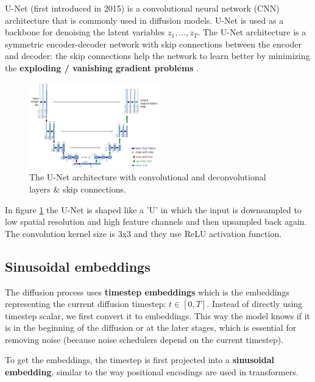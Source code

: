U-Net (first introduced in 2015) \cite{unet} is a convolutional neural network (CNN) architecture that is commonly used in diffusion models. U-Net is used as a backbone for denoising the latent variables $z_1, ..., z_T$. The U-Net architecture is a symmetric encoder-decoder network with skip connections between the encoder and decoder: the skip connections help the network to learn better by minimizing the \textbf{exploding / vanishing gradient problems} \cite{exploding_vanishing_gradients}.

\begin{figure}
    \centering
    \includegraphics[width=0.5\textwidth]{images/diffusion_models/stable_diffusion/u-net-architecture.png}
    \caption{The U-Net architecture \cite{unet} with convolutional and deconvolutional layers \& skip connections.}
    \label{fig:unet_architecture}
\end{figure}

In figure \ref{fig:unet_architecture} the U-Net is shaped like a 'U' in which the input is downsampled to low spatial resolution and high feature channels and then upsampled back again. The convolution kernel size is 3x3 and they use ReLU activation function.








\subsection{Sinusoidal embeddings}
\label{subsec:sinusoidal_embeddings}

The diffusion process uses \textbf{timestep embeddings} which is the embeddings representing the current diffusion timestep: $t \in [0, T]$. Instead of directly using timestep scalar, we first convert it to embeddings. This way the model knows if it is in the beginning of the diffusion or at the later stages, which is essential for removing noise (because noise schedulers depend on the current timestep).

To get the embeddings, the timestep is first projected into a \textbf{sinusoidal embedding}, similar to the way positional encodings are used in transformers.

